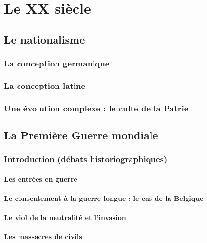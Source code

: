 \documentclass[12pt]{report}
\begin{document}
\part{Le XX siècle}

\chapter{Le nationalisme}

\section{La conception germanique}

\section{La conception latine}

\section{Une évolution complexe : le culte de la Patrie}


\chapter{La Première Guerre mondiale}

\section*{Introduction (débats historiographiques)}

\subsection{Les entrées en guerre}

\subsection{Le consentement à la guerre longue : le cas de la Belgique}

\subsection{Le viol de la neutralité et l'invasion}

\subsection{Les massacres de civils}
\end{document}
